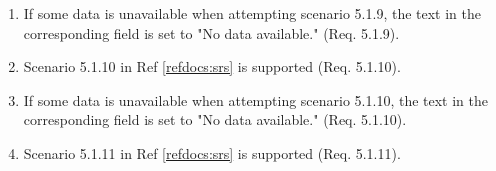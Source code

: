\documentclass[a4paper]{article}
\newlength{\testlabellength}
\newenvironment{testlist}{\begin{enumerate}[label=\bfseries Instruction \thesubsection.\arabic* , labelindent=0pt, labelwidth=\testlabellength , leftmargin=2cm]}{\end{enumerate}}
\newenvironment{precondition}{
{\color{white}BLARG}\\ 
\textbf{Precondition}
\begin{itemize}[labelindent=0cm, labelwidth=2cm , leftmargin=1cm]
}
{\end{itemize}}
\newenvironment{instruction}{
\textbf{Instructions:}
\begin{enumerate}[label=\bfseries  \arabic*., labelindent=0cm, labelwidth=2cm , leftmargin=1cm]
}
{\end{enumerate}}
\newenvironment{postcondition}{
\textbf{Postcondition:}
\begin{itemize}[labelindent=0cm, labelwidth=2cm , leftmargin=1cm]
}
{\end{itemize}}
\begin{document}
\begin{appendices}
\begin{testlist}
	\item If some data is unavailable when attempting scenario 5.1.9, the text in the corresponding field is set to "No data available." (Req. 5.1.9).

	\item Scenario 5.1.10 in Ref \ref{refdocs:srs} is supported (Req. 5.1.10).

	\item If some data is unavailable when attempting scenario 5.1.10, the text in the corresponding field is set to "No data available." (Req. 5.1.10).

	\item Scenario 5.1.11 in Ref \ref{refdocs:srs} is supported (Req. 5.1.11).


\end{testlist}
\end{appendices}
\end{document}
